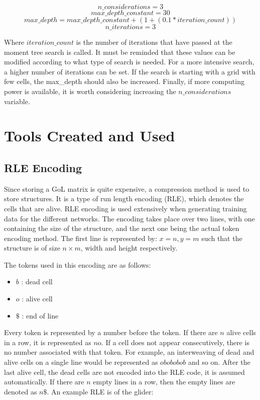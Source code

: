 \documentclass{l4proj}
\begin{document}
\[ n\_considerations = 3\]
\[ max\_depth\_constant = 30\]
\[ max\_depth = max\_depth\_constant + (1 + (0.1 * iteration\_count))\]
\[ n\_iterations = 3\]

Where $iteration\_count$ is the number of iterations that have passed at the moment tree search is called. It must be reminded that these values can be modified according to what type of search is needed. For a more intensive search, a higher number of iterations can be set. If the search is starting with a grid with few cells, the max\_depth should also be increased. Finally, if more computing power is available, it is worth considering increasing the $n\_considerations$ variable.

\section{Tools Created and Used}

\subsection{RLE Encoding}

Since storing a GoL matrix is quite expensive, a compression method is used to store structures. It is a type of run length encoding (RLE), which denotes the cells that are alive. RLE encoding is used extensively when generating training data for the different networks. The encoding takes place over two lines, with one containing the size of the structure, and the next one being the actual token encoding method. The first line is represented by: $x = n, y = m $ such that the structure is of size $n \times m$, width and height respectively.

The tokens used in this encoding are as follows:

\begin{itemize}
    \item $b$ : dead cell
    \item $o$ : alive cell
    \item $\$$ : end of line
\end{itemize}

Every token is represented by a number before the token. If there are $n$ alive cells in a row, it is represented as $n$o. If a cell does not appear consecutively, there is no number associated with that token. For example, an interweaving of dead and alive cells on a single line would be represented as $obobobob$ and so on. After the last alive cell, the dead cells are not encoded into the RLE code, it is assumed automatically. If there are $n$ empty lines in a row, then the empty lines are denoted as $n\$$. An example RLE is of the glider:
\end{document}
